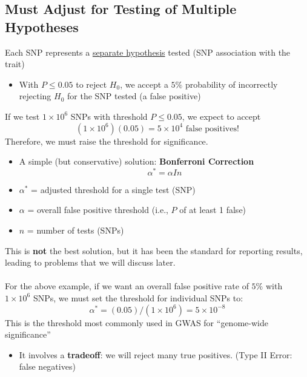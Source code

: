 \documentclass[10pt]{article}
\begin{document}
\subsection*{Must Adjust for Testing of Multiple Hypotheses}
Each SNP represents a \underline{separate hypothesis} tested (SNP association with the trait)
\begin{itemize}
	\item With $P \leq 0.05$ to reject $H_0$, we accept a $5\%$ probability of incorrectly rejecting $H_0$ for the SNP tested (a false positive)
\end{itemize}
If we test $1 \times 10^6$ SNPs with threshold $P \leq 0.05$, we expect to accept
\[(1 \times 10^6)(0.05) = 5 \times 10^4 \text{ false positives!}\]
Therefore, we must raise the threshold for significance.
\begin{itemize}
	\item A simple (but conservative) solution: \textbf{Bonferroni Correction}
	\[\alpha^* = \alpha I n\]
    \item $\alpha^*$ = adjusted threshold for a single test (SNP)
    \item $\alpha$ = overall false positive threshold (i.e., $P$ of at least 1 false)
    \item $n$ = number of tests (SNPs)
\end{itemize}
This is \textbf{not} the best solution, but it has been the standard for reporting results, leading to problems that we will discuss later.\\\\
For the above example, if we want an overall false positive rate of $5\%$ with $1 \times 10^6$ SNPs, we must set the threshold for individual SNPs to:
\[\alpha^* = (0.05) / (1 \times 10^6) = 5 \times 10^{-8}\]
This is the threshold most commonly used in GWAS for ``genome-wide significance''
\begin{itemize}
	\item It involves a \textbf{tradeoff}: we will reject many true positives.  (Type II Error: false negatives)
\end{itemize}
\end{document}
